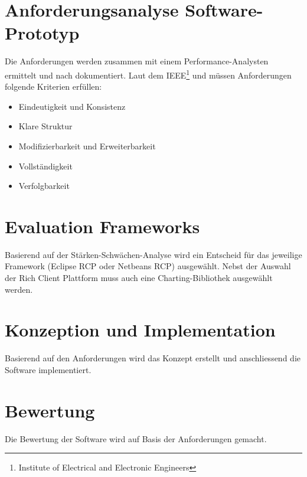 \section{Anforderungsanalyse Software-Prototyp}
Die Anforderungen werden zusammen mit einem Performance-Analysten ermittelt und nach \cite[4.3.2 Angepasste Standardinhalte]{pohl2010basiswissen} dokumentiert. Laut dem IEEE\footnote{Institute of Electrical and Electronic Engineers} und \cite[4.5 Qualitätskriterien für das Anforderungsdokument]{pohl2010basiswissen} müssen Anforderungen folgende Kriterien erfüllen:
\begin{itemize}
	\item Eindeutigkeit und Konsistenz
	\item Klare Struktur
	\item Modifizierbarkeit und Erweiterbarkeit
	\item Vollständigkeit
	\item Verfolgbarkeit
\end{itemize}
\section{Evaluation Frameworks}
Basierend auf der Stärken-Schwächen-Analyse wird ein Entscheid für das jeweilige Framework (Eclipse RCP oder Netbeans RCP)  ausgewählt. Nebst der Auswahl der Rich Client Plattform muss auch eine Charting-Bibliothek ausgewählt werden.

\section{Konzeption und Implementation}
Basierend auf den Anforderungen wird das Konzept erstellt und anschliessend die Software implementiert. 

\section{Bewertung}
Die Bewertung der Software wird auf Basis der Anforderungen gemacht.



